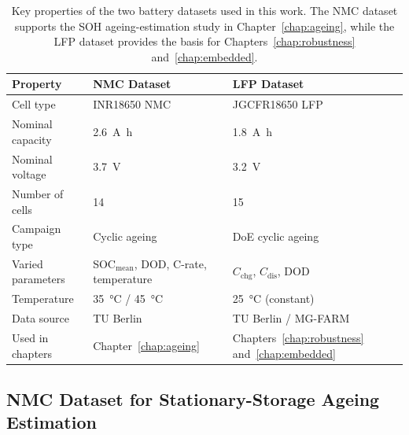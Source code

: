 \documentclass[
    a4paper,
    12pt,
    titlepage,
    bibliography=totoc,
    twoside=on,
    parskip=false,
    numbers=noenddot,
    cleardoublepage=empty,
    DIV=12,
    BCOR=12.0mm,
    headheight=36pt,
    headings=openright
]{scrreprt}
\begin{document}
\begin{table}[H]
    \centering
    \caption[Overview of the two battery datasets.]{Key properties of the two battery datasets used in this work. The NMC dataset supports the SOH ageing-estimation study in Chapter~\ref{chap:ageing}, while the LFP dataset provides the basis for Chapters~\ref{chap:robustness} and~\ref{chap:embedded}.}
    \label{tab:dataset_overview}
    \begin{tabularx}{\textwidth}{lYY}
        \toprule
        Property & NMC Dataset & LFP Dataset \\
        \midrule
        Cell type & INR18650 NMC & JGCFR18650 LFP \\
        Nominal capacity & \SI{2.6}{\ampere\hour} & \SI{1.8}{\ampere\hour} \\
        Nominal voltage & \SI{3.7}{\volt} & \SI{3.2}{\volt} \\
        Number of cells & 14 & 15 \\
        Campaign type & Cyclic ageing & DoE cyclic ageing \\
        Varied parameters & SOC$_\mathrm{mean}$, DOD, C-rate, temperature & $C_\mathrm{chg}$, $C_\mathrm{dis}$, DOD \\
        Temperature & \SI{35}{\celsius} / \SI{45}{\celsius} & \SI{25}{\celsius} (constant) \\
        Data source & TU Berlin & TU Berlin / MG-FARM\autocite{lfpDoeCycleAgingDataset2025} \\
        Used in chapters & Chapter~\ref{chap:ageing} & Chapters~\ref{chap:robustness} and~\ref{chap:embedded} \\
        \bottomrule
    \end{tabularx}
\end{table}

\subsection{NMC Dataset for Stationary-Storage Ageing Estimation}
\end{document}
